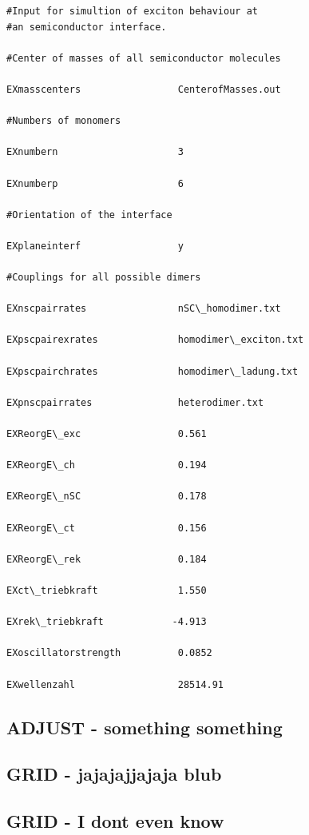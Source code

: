 \documentclass[10pt,a4paper]{article} %
\newif\ifdevmode %
\begin{document}
\begin{lstlisting}
#Input for simultion of exciton behaviour at 
#an semiconductor interface.

#Center of masses of all semiconductor molecules

EXmasscenters                 CenterofMasses.out

#Numbers of monomers

EXnumbern                     3

EXnumberp                     6

#Orientation of the interface

EXplaneinterf                 y

#Couplings for all possible dimers

EXnscpairrates                nSC\_homodimer.txt

EXpscpairexrates              homodimer\_exciton.txt

EXpscpairchrates              homodimer\_ladung.txt

EXpnscpairrates               heterodimer.txt

EXReorgE\_exc                 0.561

EXReorgE\_ch                  0.194

EXReorgE\_nSC                 0.178

EXReorgE\_ct                  0.156

EXReorgE\_rek                 0.184

EXct\_triebkraft              1.550

EXrek\_triebkraft            -4.913

EXoscillatorstrength          0.0852

EXwellenzahl                  28514.91
\end{lstlisting}	
	
	\subsection{ADJUST - something something}	
	\ifdevmode \colorbox{red}{write something here} \fi	
	
	\subsection{GRID - jajajajjajaja blub}	
	
	\subsection{GRID - I dont even know}	
	\ifdevmode \colorbox{red}{write something here} \fi	
	
\end{document}
